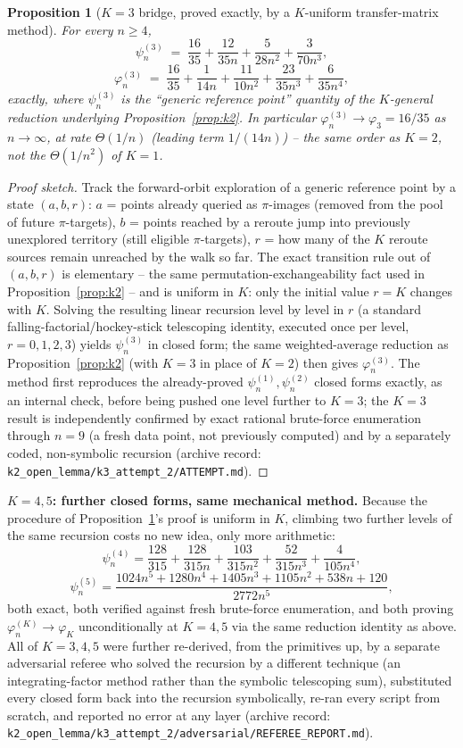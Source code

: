 \documentclass[11pt]{article}
\newtheorem{proposition}{Proposition}
\theoremstyle{remark}
\begin{document}
\begin{proposition}[$K=3$ bridge, proved exactly, by a $K$-uniform transfer-matrix method]
\label{prop:k3}
For every $n\ge4$,
\[
  \psi_n^{(3)} \;=\; \frac{16}{35}+\frac{12}{35n}+\frac{5}{28n^2}+\frac{3}{70n^3},
\]
\[
  \varphi_n^{(3)} \;=\; \frac{16}{35}+\frac1{14n}+\frac{11}{10n^2}+\frac{23}{35n^3}+\frac6{35n^4},
\]
exactly, where $\psi_n^{(3)}$ is the ``generic reference point'' quantity
of the $K$-general reduction underlying Proposition~\ref{prop:k2}. In
particular $\varphi_n^{(3)}\to\varphi_3=16/35$ as $n\to\infty$, at rate
$\Theta(1/n)$ (leading term $1/(14n)$) -- the same order as $K=2$, not
the $\Theta(1/n^2)$ of $K=1$.
\end{proposition}

\begin{proof}[Proof sketch]
Track the forward-orbit exploration of a generic reference point by a
state $(a,b,r)$: $a$ = points already queried as $\pi$-images (removed
from the pool of future $\pi$-targets), $b$ = points reached by a reroute
jump into previously unexplored territory (still eligible $\pi$-targets),
$r$ = how many of the $K$ reroute sources remain unreached by the walk so
far. The exact transition rule out of $(a,b,r)$ is elementary -- the same
permutation-exchangeability fact used in Proposition~\ref{prop:k2} -- and
is uniform in $K$: only the initial value $r=K$ changes with $K$. Solving
the resulting linear recursion level by level in $r$ (a standard
falling-factorial/hockey-stick telescoping identity, executed once per
level, $r=0,1,2,3$) yields $\psi_n^{(3)}$ in closed form; the same
weighted-average reduction as Proposition~\ref{prop:k2} (with $K=3$ in
place of $K=2$) then gives $\varphi_n^{(3)}$. The method first reproduces
the already-proved $\psi_n^{(1)},\psi_n^{(2)}$ closed forms exactly, as
an internal check, before being pushed one level further to $K=3$; the
$K=3$ result is independently confirmed by exact rational brute-force
enumeration through $n=9$ (a fresh data point, not previously computed)
and by a separately coded, non-symbolic recursion (archive record:
\texttt{k2\_open\_lemma/k3\_attempt\_2/ATTEMPT.md}).
\end{proof}

\textbf{$K=4,5$: further closed forms, same mechanical method.} Because
the procedure of Proposition~\ref{prop:k3}'s proof is uniform in $K$,
climbing two further levels of the same recursion costs no new idea,
only more arithmetic:
\[
  \psi_n^{(4)} = \frac{128}{315}+\frac{128}{315n}+\frac{103}{315n^2}+\frac{52}{315n^3}+\frac4{105n^4},
\]
\[
  \psi_n^{(5)} = \frac{1024n^5+1280n^4+1405n^3+1105n^2+538n+120}{2772n^5},
\]
both exact, both verified against fresh brute-force enumeration, and
both proving $\varphi_n^{(K)}\to\varphi_K$ unconditionally at $K=4,5$ via
the same reduction identity as above. All of $K=3,4,5$ were further
re-derived, from the primitives up, by a separate adversarial referee who
solved the recursion by a different technique (an integrating-factor
method rather than the symbolic telescoping sum), substituted every
closed form back into the recursion symbolically, re-ran every script
from scratch, and reported no error at any layer (archive record:
\texttt{k2\_open\_lemma/k3\_attempt\_2/adversarial/}\allowbreak\texttt{REFEREE\_REPORT.md}).
\end{document}
